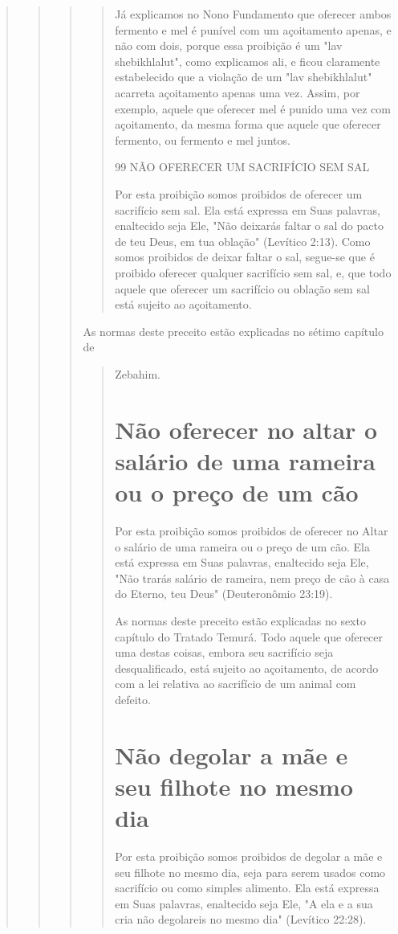 \begin{quote}
\begin{quote}
\begin{quote}
\begin{quote}
Já explicamos no Nono Fundamento que oferecer ambos fermento e mel é
punível com um açoitamento apenas, e não com dois, porque essa
proi­bição é um "lav shebikhlalut", como explicamos ali, e ficou
claramente estabe­lecido que a violação de um "lav shebikhlalut"
acarreta açoitamento apenas uma vez. Assim, por exemplo, aquele que
oferecer mel é punido uma vez com açoitamento, da mesma forma que aquele
que oferecer fermento, ou fermento e mel juntos.

99 NÃO OFERECER UM SACRIFÍCIO SEM SAL

Por esta proibição somos proibidos de oferecer um sacrifício sem sal.
Ela está expressa em Suas palavras, enaltecido seja Ele, "Não deixarás
faltar o sal do pacto de teu Deus, em tua oblação" (Levítico 2:13). Como
somos proi­bidos de deixar faltar o sal, segue-se que é proibido
oferecer qualquer sacrifício sem sal, e, que todo aquele que oferecer um
sacrifício ou oblação sem sal está sujeito ao açoitamento.
\end{quote}

As normas deste preceito estão explicadas no sétimo capítulo de

\begin{quote}
Zebahim.


\section{Não oferecer no altar o salário de uma rameira ou o preço de um cão}

Por esta proibição somos proibidos de oferecer no Altar o salário de uma
rameira ou o preço de um cão. Ela está expressa em Suas palavras,
enal­tecido seja Ele, "Não trarás salário de rameira, nem preço de cão à
casa do Eter­no, teu Deus" (Deuteronômio 23:19).

As normas deste preceito estão explicadas no sexto capítulo do Tra­tado
Temurá. Todo aquele que oferecer uma destas coisas, embora seu
sacrifí­cio seja desqualificado, está sujeito ao açoitamento, de acordo
com a lei relati­va ao sacrifício de um animal com defeito.

\section{Não degolar a mãe e seu filhote no mesmo dia}

Por esta proibição somos proibidos de degolar a mãe e seu filhote no
mesmo dia, seja para serem usados como sacrifício ou como simples
alimento. Ela está expressa em Suas palavras, enaltecido seja Ele, "A
ela e a sua cria não degolareis no mesmo dia" (Levítico 22:28).


\end{quote}
\end{quote}
\end{quote}
\end{quote}
